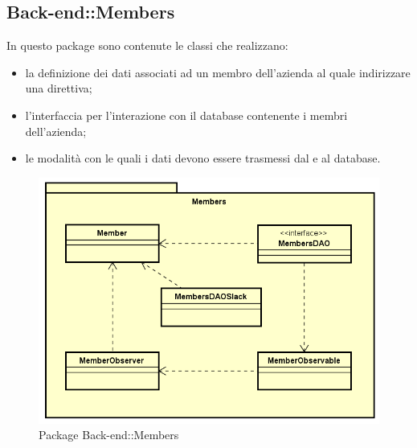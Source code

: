 \subsection{Back-end::Members}
In questo package sono contenute le classi che realizzano: \begin{itemize} \item la definizione dei dati associati ad un membro dell'azienda al quale indirizzare una direttiva; \item l'interfaccia per l'interazione con il database contenente i membri dell'azienda; \item le modalità con le quali i dati devono essere trasmessi dal e al database. \end{itemize}
\begin{figure}[h] \centering \includegraphics[width=\textwidth,height=\textheight,keepaspectratio]{images/diagrams/back-end/Official_Backend_0304/Member.png}
	\caption{Package Back-end::Members}
\end{figure}
\newpage

